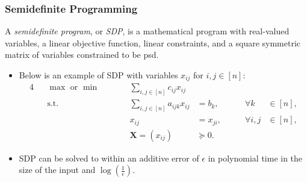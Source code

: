 \documentclass{beamer}
\begin{document}
    \begin{frame}
        \frametitle{Semidefinite Programming}
    
        \begin{definition}
            A \emph{semidefinite program}, or \emph{SDP}, is a mathematical program with real-valued variables, a linear objective function, linear constraints, and a square symmetric matrix of variables constrained to be psd.
        \end{definition}

        \pause

        \begin{itemize}
            \item Below is an example of SDP with variables $x_{ij}$ for $i, j \in [n]$:
            \begin{alignat}{4}
                && \max \text{ or } \min \qquad && \sum_{i, j \in [n]} c_{ij} x_{ij} \label{example:sdp} \\
                && \text{s.t.} \qquad && \sum_{i, j \in [n]} a_{ijk} x_{ij} &= b_k, & \qquad \forall k & \in [n], \nonumber \\
                && && x_{ij} &= x_{ji}, & \qquad \forall i, j & \in [n], \nonumber \\
                && && \mathbf X = \left(x_{ij}\right) & \succeq 0. \nonumber
              \end{alignat}
              \pause
              \vspace{-2em}
              \item SDP can be solved to within an additive error of $\epsilon$ in polynomial time in the size of the input and $\log(\frac{1}{\epsilon})$.
        \end{itemize}
    \end{frame}
\end{document}
